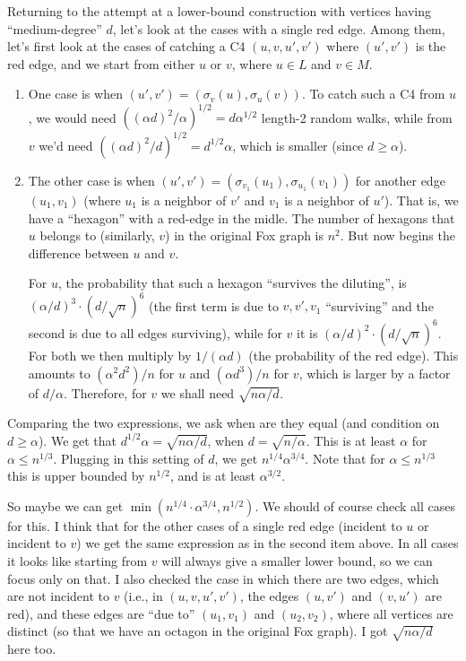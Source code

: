 \documentclass{article}
\begin{document}
Returning to the attempt at a lower-bound construction with vertices having ``medium-degree'' $d$, let's look at the cases with a single red edge. Among them, let's first look at the cases of catching a C4 $(u,v,u',v')$ where $(u',v')$ is the red edge, and we start from either $u$ or $v$, where $u \in L$ and $v\in M$.
\begin{enumerate}
\item One case is when $(u',v') = (\sigma_v(u), \sigma_u(v))$. To catch such a C4 from $u$, we would need $((\alpha d)^2/\alpha)^{1/2} = d\alpha^{1/2}$ length-2 random walks, while from $v$ we'd need $((\alpha d)^2/d)^{1/2} = d^{1/2}\alpha$, which is smaller (since $d \geq \alpha$).
\item The other case is when $(u',v') = (\sigma_{v_1}(u_1), \sigma_{u_1}(v_1))$ for another  edge $(u_1,v_1)$ (where $u_1$ is a neighbor of $v'$ and $v_1$ is a neighbor of $u'$). That is, we have a ``hexagon'' with a red-edge in the midle. The number of hexagons that $u$ belongs to (similarly, $v$) in the original Fox graph is $n^2$. But now begins the difference between $u$ and $v$.

    For $u$, the probability that such a hexagon ``survives the diluting'', is $(\alpha/d)^3 \cdot (d/\sqrt{n})^6$ (the first term is due to $v, v', v_1$ ``surviving'' and the second is due to all edges surviving), while for $v$ it is $(\alpha/d)^2 \cdot (d/\sqrt{n})^6$. For both we then multiply by $1/(\alpha d)$ (the probability of the red edge). This amounts to $(\alpha^2 d^2)/n$ for $u$ and $(\alpha d^3)/n$ for $v$, which is larger by a factor of $d/\alpha$. Therefore, for $v$ we shall need $\sqrt{n \alpha/d}$.
\end{enumerate}
Comparing the two expressions, we ask when are they equal (and condition on $d\geq \alpha$).
We get that
$d^{1/2}\alpha = \sqrt{n \alpha/d}$, when $d=\sqrt{n/\alpha}$. This is at least $\alpha$ for $\alpha \leq n^{1/3}$.
Plugging in this setting of $d$, we get $n^{1/4}\alpha^{3/4}$. Note that for $\alpha \leq n^{1/3}$ this is upper bounded by $n^{1/2}$, and is at least $\alpha^{3/2}$.

So maybe we can get $\min(n^{1/4}\cdot\alpha^{3/4},n^{1/2})$. We should of course check all cases for this. I think that for the other cases of a single red edge (incident to $u$ or incident to $v$) we get the same expression as in the second item above. In all cases it looks like starting from $v$ will always give a smaller lower bound, so we can focus only on that. I also checked the case in which there are two edges, which are not incident to $v$ (i.e., in $(u,v,u',v')$, the edges $(u,v')$ and $(v,u')$ are red), and these edges are ``due to'' $(u_1,v_1)$ and $(u_2,v_2)$, where all vertices are distinct (so that we have an octagon in the original Fox graph). I got $\sqrt{n\alpha/d}$ here too.
\end{document}
